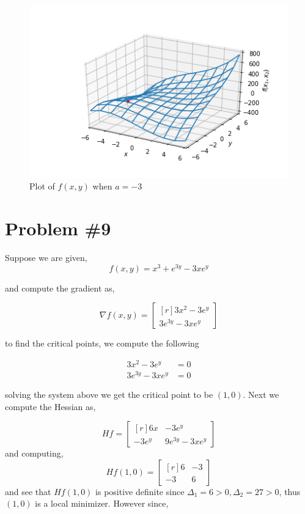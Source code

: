 \documentclass{article}
\begin{document}
\begin{figure}[H]
    \centering
    \includegraphics[scale=0.6]{aNeg.png}
    \caption{Plot of $f(x,y)$ when $a = -3$}
    \label{fig:my_label}
\end{figure}

\section*{Problem \#9}
Suppose we are given,
\begin{equation*}
    f(x,y) = x^3 + e^{3y} - 3xe^y
\end{equation*}

and compute the gradient as,

\begin{equation*}
    \nabla f(x,y) = \begin{bmatrix*}[r]
        3x^2 - 3e^y \\
        3e^{3y} - 3xe^y
    \end{bmatrix*}
\end{equation*}

to find the critical points, we compute the following

\begin{align*}
    3x^2 - 3e^y &= 0\\
        3e^{3y} - 3xe^y &= 0
\end{align*}

solving the system above we get the critical point to be $(1,0)$. Next we compute the Hessian as,

\begin{equation*}
    Hf = \begin{bmatrix*}[r]
        6x & -3e^y \\
        -3e^y & 9e^{3y}-3xe^y
    \end{bmatrix*}
\end{equation*}
and computing,
\begin{equation*}
    Hf(1,0) = \begin{bmatrix*}[r]
        6 & -3 \\
        -3 & 6
    \end{bmatrix*}
\end{equation*}
and see that $Hf(1,0)$ is positive definite since $\Delta_1 = 6 > 0, \Delta_2 = 27 >0$, thus $(1,0)$ is a local minimizer. However since,
\end{document}
